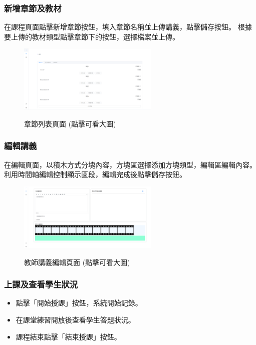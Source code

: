 \documentclass[12pt]{article}
\begin{document}
\subsubsection{新增章節及教材}
在課程頁面點擊新增章節按鈕，填入章節名稱並上傳講義，點擊儲存按鈕。
根據要上傳的教材類型點擊章節下的按鈕，選擇檔案並上傳。

\begin{figure}[H]
  \centering
  \href{https://raw.githubusercontent.com/programingtw/proglearn-plan/main/2023全國大專校院智慧創新暨跨域整合創作競賽/img/chapter.png}{
    \includegraphics[width=0.60\textwidth]{./img/chapter.png}
  }
  \caption{章節列表頁面 (點擊可看大圖)}
\end{figure}

\subsubsection{編輯講義}
在編輯頁面，以積木方式分塊內容，方塊區選擇添加方塊類型，編輯區編輯內容。
利用時間軸編輯控制顯示區段，編輯完成後點擊儲存按鈕。

\begin{figure}[H]
  \centering
  \href{https://raw.githubusercontent.com/programingtw/proglearn-plan/main/2023全國大專校院智慧創新暨跨域整合創作競賽/img/teacher2.png}{
    \includegraphics[width=0.60\textwidth]{./img/teacher2.png}
  }
  \caption{教師講義編輯頁面 (點擊可看大圖)}
\end{figure}

\subsubsection{上課及查看學生狀況}

\begin{itemize}
  \item 點擊「開始授課」按鈕，系統開始記錄。
  \item 在課堂練習開放後查看學生答題狀況。
  \item 課程結束點擊「結束授課」按鈕。
\end{itemize}
\end{document}
